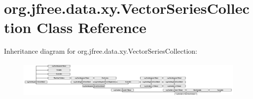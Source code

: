 \hypertarget{classorg_1_1jfree_1_1data_1_1xy_1_1_vector_series_collection}{}\section{org.\+jfree.\+data.\+xy.\+Vector\+Series\+Collection Class Reference}
\label{classorg_1_1jfree_1_1data_1_1xy_1_1_vector_series_collection}
Inheritance diagram for org.\+jfree.\+data.\+xy.\+Vector\+Series\+Collection\+:\begin{figure}[H]
\begin{center}
\leavevmode
\includegraphics[height=1.823362cm]{classorg_1_1jfree_1_1data_1_1xy_1_1_vector_series_collection}
\end{center}
\end{figure}
